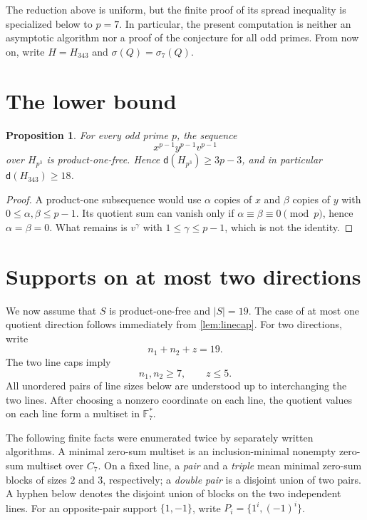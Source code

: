 \documentclass[11pt]{amsart}
\newtheorem{proposition}[theorem]{Proposition}
\theoremstyle{definition}
\newcommand{\F}{\mathbb F}
\newcommand{\HH}{H_{343}}
\newcommand{\dd}{\mathsf d}
\begin{document}
The reduction above is uniform, but the finite proof of its spread
inequality is specialized below to $p=7$.  In particular, the present
computation is neither an asymptotic algorithm nor a proof of the
conjecture for all odd primes.  From now on, write $H=\HH$ and
$\sigma(Q)=\sigma_7(Q)$.

\section{The lower bound}

\begin{proposition}\label{prop:lower}
For every odd prime $p$, the sequence
\[
x^{p-1}y^{p-1}v^{p-1}
\]
over $H_{p^3}$ is product-one-free.  Hence
$\dd(H_{p^3})\geq3p-3$, and in particular $\dd(\HH)\geq18$.
\end{proposition}

\begin{proof}
A product-one subsequence would use $\alpha$ copies of $x$ and $\beta$
copies of $y$ with $0\leq\alpha,\beta\leq p-1$.  Its quotient sum can
vanish only if $\alpha\equiv\beta\equiv0\pmod p$, hence
$\alpha=\beta=0$.  What remains is $v^\gamma$ with
$1\leq\gamma\leq p-1$, which is not the identity.
\end{proof}

\section{Supports on at most two directions}\label{sec:two-directions}

We now assume that $S$ is product-one-free and $|S|=19$. The case of at most one quotient direction follows immediately from \cref{lem:linecap}. For two directions, write
\[
n_1+n_2+z=19.
\]
The two line caps imply
\[
n_1,n_2\geq7,\qquad z\leq5.
\]
All unordered pairs of line sizes below are understood up to
interchanging the two lines.
After choosing a nonzero coordinate on each line, the quotient values on each line form a multiset in $\F_7^*$.

The following finite facts were enumerated twice by separately written algorithms. A minimal zero-sum multiset is an inclusion-minimal nonempty zero-sum multiset over $C_7$.
On a fixed line, a \emph{pair} and a \emph{triple} mean minimal
zero-sum blocks of sizes $2$ and $3$, respectively; a \emph{double
pair} is a disjoint union of two pairs.  A hyphen below denotes the
disjoint union of blocks on the two independent lines.  For an
opposite-pair support $\{1,-1\}$, write
$P_i=\{1^i,(-1)^i\}$.
\end{document}
